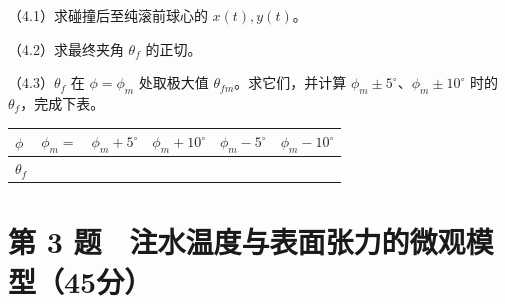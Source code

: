 \documentclass[12pt,a4paper,fontset=fandol]{ctexart}
\begin{document}
（4.1）求碰撞后至纯滚前球心的 \(x(t),y(t)\)。

（4.2）求最终夹角 \(\theta_f\) 的正切。

（4.3）\(\theta_f\) 在 \(\phi=\phi_m\) 处取极大值
\(\theta_{fm}\)。求它们，并计算
\(\phi_m\pm5^\circ\)、\(\phi_m\pm10^\circ\) 时的
\(\theta_f\)，完成下表。

{\def\LTcaptype{table} %
\begin{longtable}[]{@{}
  >{\raggedright\arraybackslash}p{}
  >{\raggedright\arraybackslash}p{}
  >{\raggedright\arraybackslash}p{}
  >{\raggedright\arraybackslash}p{}
  >{\raggedright\arraybackslash}p{}
  >{\raggedright\arraybackslash}p{}@{}}
\toprule\noalign{}
\begin{minipage}[b]{\linewidth}\raggedright
\(\phi\)
\end{minipage} & \begin{minipage}[b]{\linewidth}\raggedright
\(\phi_m=\)
\end{minipage} & \begin{minipage}[b]{\linewidth}\raggedright
\(\phi_m+5^\circ\)
\end{minipage} & \begin{minipage}[b]{\linewidth}\raggedright
\(\phi_m+10^\circ\)
\end{minipage} & \begin{minipage}[b]{\linewidth}\raggedright
\(\phi_m-5^\circ\)
\end{minipage} & \begin{minipage}[b]{\linewidth}\raggedright
\(\phi_m-10^\circ\)
\end{minipage} \\
\midrule\noalign{}
\endhead
\bottomrule\noalign{}
\endlastfoot
\(\theta_f\) & & & & & \\
\end{longtable}
}

\clearpage

\section{第 3
题　注水温度与表面张力的微观模型（45分）}\label{ux7b2c-3-ux9898-ux6ce8ux6c34ux6e29ux5ea6ux4e0eux8868ux9762ux5f20ux529bux7684ux5faeux89c2ux6a21ux578b45ux5206}
\end{document}
